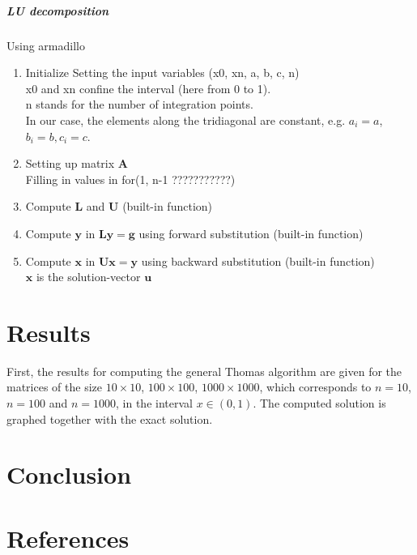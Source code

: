 \documentclass[%
oneside,                 %
final,                   %
10pt]{article}
\begin{document}
\subparagraph{LU decomposition}
Using armadillo 
\begin{enumerate}
\item Initialize Setting the input variables (x0, xn, a, b, c, n) \\
	x0 and xn confine the interval (here from 0 to 1). \\
	n stands for the number of integration points. \\
	In our case, the elements along the tridiagonal are constant, e.g. $a_i=a$, $b_i=b, c_i=c$. 

\item Setting up matrix $\mathbf{A}$ \\
	 Filling in values in for(1, 
		n-1 ???????????)
		
\item Compute $\mathbf{L}$ and $\mathbf{U}$ (built-in function)

\item Compute $\mathbf{y}$ in $\mathbf{Ly}=\mathbf{g}$ using forward substitution (built-in function)

\item Compute $\mathbf{x}$ in $\mathbf{Ux}=\mathbf{y}$ using backward substitution (built-in function)\\
		$\mathbf{x}$ is the solution-vector $\mathbf{u}$ 
\end{enumerate}
\section{Results}
First, the results for computing the general Thomas algorithm are given for the matrices of the size $10 \times 10$, $100 \times 100$, $1000 \times 1000$, which corresponds to $n=10$, $n=100$ and $n=1000$, in the interval $x \in (0,1)$. The computed solution is graphed together with the exact solution.

\section{Conclusion}
\section{References}











\end{document}
